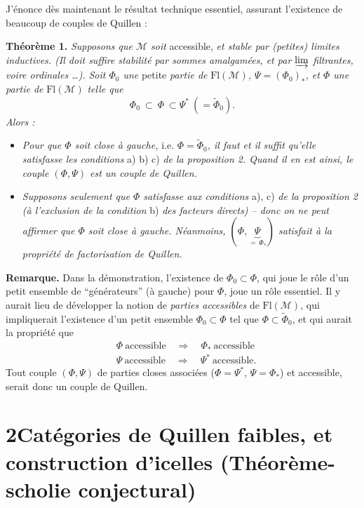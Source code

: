 \documentclass[11pt]{article}
\newcommand{\printedpage}[1]{\marginpar{\footnotesize p.~#1}}
\newcommand{\msp}[1]{\marginpar{\footnotesize [#1]}}
\newcommand{\Fl}{\mathrm{Fl}}
\newcommand{\cM}{\mathcal{M}}
\begin{document}
J'énonce dès maintenant le résultat technique essentiel, assurant l'existence de beaucoup de couples de Quillen :

\setcounter{footnote}{4}

\printedpage{4}
\msp{page 6}\textbf{Théorème 1.} \textit{Supposons que $\cM$ soit} accessible, \textit{et stable par (petites) limites inductives. (Il doit suffire stabilité par sommes amalgamées, et par $\varinjlim$ filtrantes, voire ordinales \dots).} \textit{Soit $\Phi_0$ une} petite \textit{partie de} $\Fl(\cM)$\textit{, $\Psi=(\Phi_0)_*$, et $\Phi$ une partie de} $\Fl(\cM)$ \textit{telle que}
\[
\Phi_0\ \subset\ \Phi\ \subset\Psi^*\ (=\widetilde{\Phi}_0).
\]
\textit{Alors :}

\begin{itemize}[leftmargin=2.5em]
\item[a)] \textit{Pour que $\Phi$ soit close à gauche,} i.e. $\Phi=\widetilde{\Phi}_0$\textit{, il faut et il suffit qu'elle satisfasse les conditions} a) b) c) \textit{de la proposition 2. Quand il en est ainsi, le couple $(\Phi,\Psi)$ est un couple de Quillen.}

\item[b)] \textit{Supposons seulement que $\Phi$ satisfasse aux conditions} a), c) \textit{de la proposition 2 (à l'exclusion de la condition} b) \textit{des facteurs directs) – donc on ne peut affirmer que $\Phi$ soit close à gauche. Néanmoins, $(\Phi,\underbrace{\Psi}_{=\,\Phi_*})$ satisfait à la propriété de factorisation de Quillen.}
\end{itemize}

\textbf{Remarque.} Dans la démonstration, l'existence de $\Phi_0\subset\Phi$, qui joue le rôle d'un petit ensemble de “générateurs” (à gauche) pour $\Phi$, joue un rôle essentiel. Il y aurait lieu de développer la notion de \textit{parties accessibles}
\msp{page 7}
de $\Fl(\cM)$, qui impliquerait l'existence d'un petit ensemble $\Phi_0\subset\Phi$ tel que $\Phi\subset\widetilde{\Phi}_0$, et qui aurait la propriété que
\[
\begin{aligned}
&\Phi\ \text{accessible}\quad\Longrightarrow\quad\Phi_*\ \text{accessible}\\
&\Psi\ \text{accessible}\quad\Longrightarrow\quad\Psi^*\ \text{accessible.}
\end{aligned}
\]
Tout couple $(\Phi,\Psi)$ de parties closes associées ($\Phi=\Psi^*$, $\Psi=\Phi_*$) et accessible, serait donc un couple de Quillen.

\section*{2\quad Catégories de Quillen faibles, et construction d'icelles (Théorème-scholie conjectural)}
\end{document}
